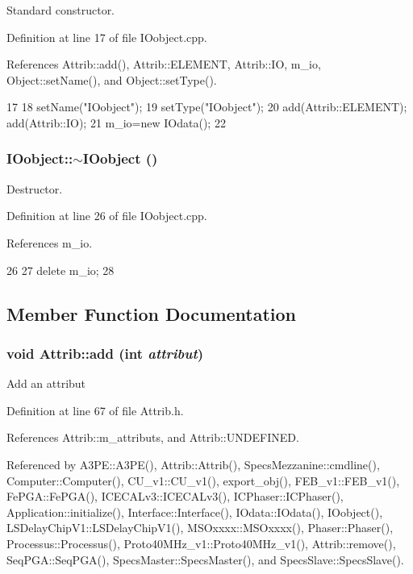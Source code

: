 Standard constructor. 

Definition at line 17 of file IOobject.cpp.

References Attrib::add(), Attrib::ELEMENT, Attrib::IO, m\_\-io, Object::setName(), and Object::setType().


\begin{DoxyCode}
17                      {
18   setName("IOobject");
19   setType("IOobject");
20   add(Attrib::ELEMENT);  add(Attrib::IO);
21   m_io=new IOdata();
22 }
\end{DoxyCode}
\hypertarget{classIOobject_a1db3f3f5d07a00a0b4cd47b2a0222f84}{
\subsubsection[{$\sim$IOobject}]{\setlength{\rightskip}{0pt plus 5cm}IOobject::$\sim$IOobject ()}}
\label{classIOobject_a1db3f3f5d07a00a0b4cd47b2a0222f84}


Destructor. 

Definition at line 26 of file IOobject.cpp.

References m\_\-io.


\begin{DoxyCode}
26                     {
27   delete m_io;
28 }
\end{DoxyCode}


\subsection{Member Function Documentation}
\hypertarget{classAttrib_a235f773af19c900264a190b00a3b4ad7}{
\subsubsection[{add}]{\setlength{\rightskip}{0pt plus 5cm}void Attrib::add (int {\em attribut})}}
\label{classAttrib_a235f773af19c900264a190b00a3b4ad7}
Add an attribut 

Definition at line 67 of file Attrib.h.

References Attrib::m\_\-attributs, and Attrib::UNDEFINED.

Referenced by A3PE::A3PE(), Attrib::Attrib(), SpecsMezzanine::cmdline(), Computer::Computer(), CU\_\-v1::CU\_\-v1(), export\_\-obj(), FEB\_\-v1::FEB\_\-v1(), FePGA::FePGA(), ICECALv3::ICECALv3(), ICPhaser::ICPhaser(), Application::initialize(), Interface::Interface(), IOdata::IOdata(), IOobject(), LSDelayChipV1::LSDelayChipV1(), MSOxxxx::MSOxxxx(), Phaser::Phaser(), Processus::Processus(), Proto40MHz\_\-v1::Proto40MHz\_\-v1(), Attrib::remove(), SeqPGA::SeqPGA(), SpecsMaster::SpecsMaster(), and SpecsSlave::SpecsSlave().


